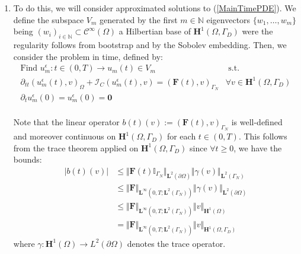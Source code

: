 \begin{enumerate}
    \item To do this, we will consider approximated solutions to (\ref{MainTimePDE}). We define the subspace $V_m$ generated by the first $m \in \mathbb{N}$ eigenvectors $\{w_1, \dots, w_m \}$ being $(w_i)_{i \in \mathbb{N}} \subset \mathcal{C}^{\infty}(\Omega)$ a Hilbertian base of $\mathbf{H}^1(\Omega, \Gamma_D)$ were the regularity follows from bootstrap and by the Sobolev embedding.
    Then, we consider the problem in time, defined by:
    \begin{equation}
        \label{ApproxTimePDE}
        \begin{array}{cc}
            \text{Find } u^{\epsilon}_m: t \in (0,T) \longrightarrow u_m(t) \in V_m & \text{ s.t. } \\
            \partial_{tt}(u_m^{\epsilon}(t),v)_{\Omega} + \mathcal{I}_{C}(u^{\epsilon}_m(t),v) = (\mathbf{F}(t),v)_{\Gamma_N} & \forall v \in \mathbf{H}^1(\Omega,\Gamma_D) \\
            \partial_{t} u^{\epsilon}_m(0) = u^{\epsilon}_m(0) = \mathbf{0} & \\
        \end{array}
    \end{equation}
    \begin{rem}
    Note that the linear operator $b(t)(v) := (\mathbf{F}(t),v)_{\Gamma_N}$ is well-defined and moreover continuous on $\mathbf{H}^1(\Omega,\Gamma_D)$ for each $t \in (0,T)$.
    This follows from the trace theorem applied on $\mathbf{H}^1(\Omega, \Gamma_D)$ since $\forall t \geq 0$, we have the bounds:
    \begin{align*}
        \vert b(t)(v) \vert & \leq \Vert \mathbf{F}(t) \mathbb{I}_{\Gamma_N} \Vert_{\mathbf{L}^2(\partial \Omega)} \Vert \gamma (v) \Vert_{\mathbf{L}^2(\Gamma_N)} \\
        & \leq \Vert \mathbf{F}\Vert_{\mathbf{L}^{\infty}(0,T;\mathbf{L}^2(\Gamma_N))} \Vert \gamma(v) \Vert_{\mathbf{L}^2(\partial \Omega)} \\
        & \leq \Vert \mathbf{F} \Vert_{\mathbf{L}^{\infty}(0,T;\mathbf{L}^2(\Gamma_N))} \Vert v \Vert_{\mathbf{H}^1(\Omega)}\\
        & = \Vert \mathbf{F}\Vert_{\mathbf{L}^{\infty}(0,T;\mathbf{L}^2(\Gamma_N))} \Vert v \Vert_{\mathbf{H}^1(\Omega, \Gamma_D)}
    \end{align*}
    where $\gamma: \mathbf{H}^1(\Omega) \longrightarrow L^2(\partial \Omega)$ denotes the trace operator.
    \end{rem}

\end{enumerate}
